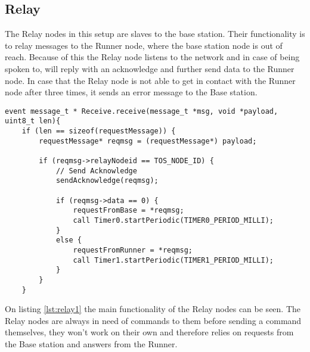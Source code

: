 \subsection{Relay}\label{sc:relay}
The Relay nodes in this setup are slaves to the base station. Their functionality is to relay messages to the Runner node, where the base station node is out of reach. Because of this the Relay node listens to the network and in case of being spoken to, will reply with an acknowledge and further send data to the Runner node. In case that the Relay node is not able to get in contact with the Runner node after three times, it sends an error message to the Base station.

\begin{minipage}[t]{0.95\linewidth}
	\begin{lstlisting}[caption=Receive message event of Relay., label={lst:relay1}]
event message_t * Receive.receive(message_t *msg, void *payload, uint8_t len){
	if (len == sizeof(requestMessage)) {
		requestMessage* reqmsg = (requestMessage*) payload;
		
		if (reqmsg->relayNodeid == TOS_NODE_ID) {
			// Send Acknowledge
			sendAcknowledge(reqmsg);
			
			if (reqmsg->data == 0) {	
				requestFromBase = *reqmsg;
				call Timer0.startPeriodic(TIMER0_PERIOD_MILLI);		
			}
			else {
				requestFromRunner = *reqmsg;
				call Timer1.startPeriodic(TIMER1_PERIOD_MILLI);
			}
		}
	}
	\end{lstlisting}
\end{minipage}

On listing \ref{lst:relay1} the main functionality of the Relay nodes can be seen. The Relay nodes are always in need of commands to them before sending a command themselves, they won't work on their own and therefore relies on requests from the Base station and answers from the Runner.